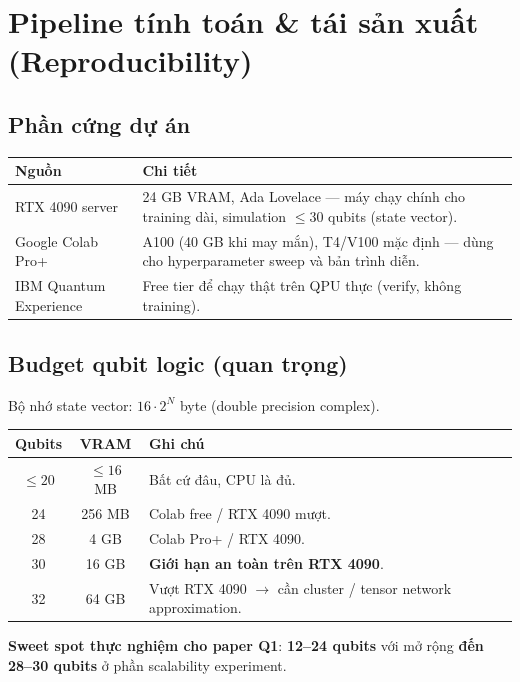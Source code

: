 \documentclass[11pt,a4paper]{article}
\begin{document}
\section{Pipeline tính toán \& tái sản xuất (Reproducibility)}

\subsection{Phần cứng dự án}

\begin{longtable}{@{}p{4cm} p{11cm}@{}}
\toprule
\textbf{Nguồn} & \textbf{Chi tiết} \\
\midrule
\endhead
RTX 4090 server & 24 GB VRAM, Ada Lovelace --- máy chạy chính cho training dài, simulation $\leq 30$ qubits (state vector). \\
Google Colab Pro+ & A100 (40 GB khi may mắn), T4/V100 mặc định --- dùng cho hyperparameter sweep và bản trình diễn. \\
IBM Quantum Experience & Free tier để chạy thật trên QPU thực (verify, không training). \\
\bottomrule
\end{longtable}

\subsection{Budget qubit logic (quan trọng)}

Bộ nhớ state vector: $16 \cdot 2^N$ byte (double precision complex).

\begin{longtable}{@{}c c p{10cm}@{}}
\toprule
\textbf{Qubits} & \textbf{VRAM} & \textbf{Ghi chú} \\
\midrule
\endhead
$\leq 20$ & $\leq 16$ MB & Bất cứ đâu, CPU là đủ. \\
24 & 256 MB & Colab free / RTX 4090 mượt. \\
28 & 4 GB & Colab Pro+ / RTX 4090. \\
30 & 16 GB & \textbf{Giới hạn an toàn trên RTX 4090}. \\
32 & 64 GB & Vượt RTX 4090 $\rightarrow$ cần cluster / tensor network approximation. \\
\bottomrule
\end{longtable}

\textbf{Sweet spot thực nghiệm cho paper Q1}: \textbf{12--24 qubits} với mở rộng \textbf{đến 28--30 qubits} ở phần scalability experiment.
\end{document}
